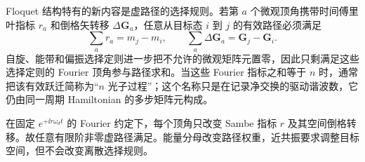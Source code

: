 Floquet 结构特有的新内容是虚路径的选择规则。若第 $a$ 个微观顶角携带时间傅里叶指标 $r_a$ 和倒格矢转移 $\Delta\mathbf G_a$，任意从目标态 $i$ 到 $j$ 的有效路径必须满足
\begin{equation}
\boxed{
\sum_a r_a=m_j-m_i,
\qquad
\sum_a\Delta\mathbf G_a=\mathbf G_j-\mathbf G_i.}
\label{eq:floquet-virtual-path-selection-dp19}
\end{equation}
自旋、能带和偏振选择定则进一步把不允许的微观矩阵元置零，因此只剩满足这些选择定则的 Fourier 顶角参与路径求和。当这些 Fourier 指标之和等于 $n$ 时，通常把该有效跃迁简称为“$n$ 光子过程”；这个名称只是在记录净交换的驱动谐波数，它仍由同一周期 Hamiltonian 的多步矩阵元构成。

\begin{lemma}
在固定 $e^{+\ii r\omega_dt}$ 的 Fourier 约定下，每个顶角只改变 Sambe 指标 $r$ 及其空间倒格转移。故任意有限阶非零虚路径满足。能量分母改变路径权重，近共振要求调整目标空间，但不会改变离散选择规则。
\end{lemma}

